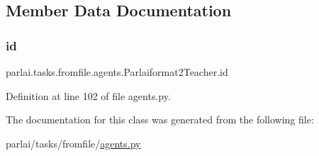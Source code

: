\subsection{Member Data Documentation}
\mbox{\label{classparlai_1_1tasks_1_1fromfile_1_1agents_1_1Parlaiformat2Teacher_aeea3091d7296c9abc5376a3b920a31b8}} 
\subsubsection{\texorpdfstring{id}{id}}
{\footnotesize\ttfamily parlai.\+tasks.\+fromfile.\+agents.\+Parlaiformat2\+Teacher.\+id}



Definition at line 102 of file agents.\+py.



The documentation for this class was generated from the following file\+:\begin{DoxyCompactItemize}
\item 
parlai/tasks/fromfile/\hyperlink{parlai_2tasks_2fromfile_2agents_8py}{agents.\+py}\end{DoxyCompactItemize}
